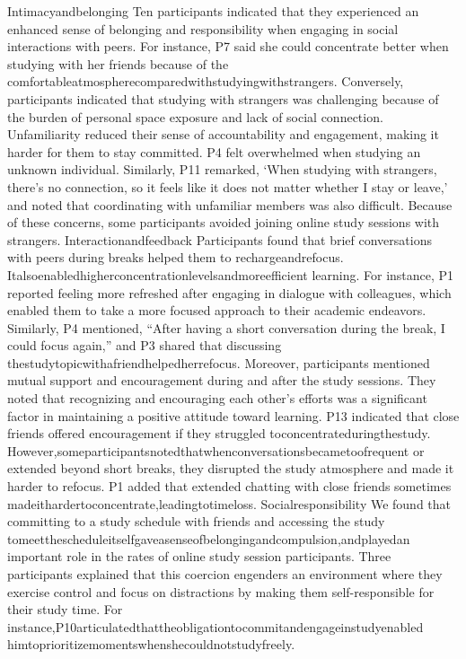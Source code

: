 \documentclass[12pt]{ctexart}
\begin{document}
Intimacyandbelonging
Ten participants indicated that they experienced an enhanced sense of belonging
and responsibility when engaging in social interactions with peers. For instance,
P7 said she could concentrate better when studying with her friends because of the
comfortableatmospherecomparedwithstudyingwithstrangers.
Conversely, participants indicated that studying with strangers was challenging
because of the burden of personal space exposure and lack of social connection.
Unfamiliarity reduced their sense of accountability and engagement, making it
harder for them to stay committed. P4 felt overwhelmed when studying an
unknown individual. Similarly, P11 remarked, ‘When studying with strangers,
there’s no connection, so it feels like it does not matter whether I stay or leave,’
and noted that coordinating with unfamiliar members was also difficult. Because
of these concerns, some participants avoided joining online study sessions with
strangers.
Interactionandfeedback
Participants found that brief conversations with peers during breaks helped them to
rechargeandrefocus. Italsoenabledhigherconcentrationlevelsandmoreefficient
learning. For instance, P1 reported feeling more refreshed after engaging in
dialogue with colleagues, which enabled them to take a more focused approach to
their academic endeavors. Similarly, P4 mentioned, “After having a short
conversation during the break, I could focus again,” and P3 shared that discussing
thestudytopicwithafriendhelpedherrefocus.
Moreover, participants mentioned mutual support and encouragement during
and after the study sessions. They noted that recognizing and encouraging each
other’s efforts was a significant factor in maintaining a positive attitude toward
learning. P13 indicated that close friends offered encouragement if they struggled
toconcentrateduringthestudy.
However,someparticipantsnotedthatwhenconversationsbecametoofrequent
or extended beyond short breaks, they disrupted the study atmosphere and made it
harder to refocus. P1 added that extended chatting with close friends sometimes
madeithardertoconcentrate,leadingtotimeloss.
Socialresponsibility
We found that committing to a study schedule with friends and accessing the study
tomeetthescheduleitselfgaveasenseofbelongingandcompulsion,andplayedan
important role in the rates of online study session participants. Three participants
explained that this coercion engenders an environment where they exercise control
and focus on distractions by making them self-responsible for their study time. For
instance,P10articulatedthattheobligationtocommitandengageinstudyenabled
himtoprioritizemomentswhenshecouldnotstudyfreely.
\end{document}

